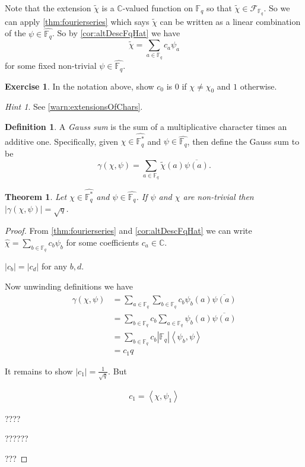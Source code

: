 \documentclass[11pt]{article}
\newcommand{\BB}[1]{\mathbb{#1}} %
\newcommand{\script}[1]{\mathcal{#1}} %
\newcommand{\free}[1]{\left\langle#1\right\rangle} %
\newcommand{\CC}{\BB{C}}
\newcommand{\FF}{\BB{F}}
\newcommand{\sF}{\script{F}}
\renewcommand{\hat}{\widehat}
\theoremstyle{plain}
\newtheorem{thm}[theoremcounter]{Theorem}
\theoremstyle{definition}
\newtheorem{defn}[definitioncounter]{Definition}
\newtheorem{excer}[exercisecounter]{Exercise}
\theoremstyle{remark}
\newtheorem*{hint}{Hint}
\begin{document}
Note that the extension $\widetilde{\chi}$ is a $\CC$-valued function on $\FF_q$ so that $\widetilde{\chi}\in\sF_{\FF_q}$. So we can apply \autoref{thm:fourierseries} which says $\widetilde{\chi}$ can be written as a linear combination of the $\psi\in\hat{\FF_q}$. So by \autoref{cor:altDescFqHat} we have
$$
\widetilde{\chi} = \sum_{a\in\FF_q}c_a\psi_a
$$
for some fixed non-trivial $\psi\in\hat{\FF_q}$.

\begin{excer}\label{ex:c_0ForChi}
	In the notation above, show $c_0$ is $0$ if $\chi\neq\chi_0$ and $1$ otherwise.
	\begin{hint}
		See \autoref{warn:extensionsOfChars}.
	\end{hint}
\end{excer}

\begin{defn}
	A \emph{Gauss sum} is the sum of a multiplicative character times an additive one. Specifically, given $\chi\in\hat{\FF_q^*}$ and $\psi\in\hat{\FF_q}$, then define the Gauss sum to be
	$$
	\gamma(\chi,\psi) = \sum_{a\in\FF_q}\widetilde{\chi}(a)\overline{\psi(a)}.
	$$
\end{defn}

\begin{thm}
	Let $\chi\in\hat{\FF_q^*}$ and $\psi\in\hat{\FF_q}$. If $\psi$ and $\chi$ are non-trivial then $\left|\gamma(\chi,\psi)\right| = \sqrt{q}$.
\end{thm}
\begin{proof}
	From \autoref{thm:fourierseries} and \autoref{cor:altDescFqHat} we can write $\widehat{\chi} = \sum_{b\in\FF_q}c_b\psi_b$ for some coefficients $c_a\in\CC$.
	
	\begin{claim}
		$|c_b| = |c_d|$ for any $b,d$.
	\end{claim}
	
	Now unwinding definitions we have
	\begin{align*}
		\gamma(\chi,\psi)
		&= \sum_{a\in\FF_q}\sum_{b\in\FF_q}c_b\psi_b(a)\overline{\psi(a)}
		\\
		&= \sum_{b\in\FF_q}c_b\sum_{a\in\FF_q}\psi_b(a)\overline{\psi(a)}
		\\
		&= \sum_{b\in\FF_q}c_b|\FF_q|\free{\psi_b,\psi}
		\\
		&=
		c_1q
	\end{align*}
	
	It remains to show $|c_1| = \frac{1}{\sqrt{q}}$. But
	
	\begin{align*}
		c_1 = \free{\chi,\psi_1}
	\end{align*}
	
	????
	
	??????
	
	???
\end{proof}
\end{document}
